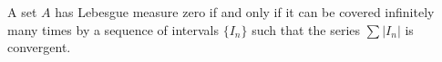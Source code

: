 A set $A$ has Lebesgue measure zero if and only if it can be covered infinitely many times by a sequence of intervals $\{I_n\}$ such that the series $\sum |I_n|$ is convergent.
